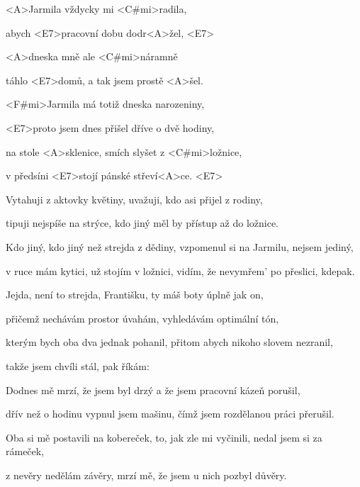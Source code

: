 

\zs
<A>Jarmila vždycky mi <C#mi>radila,

abych <E7>pracovní dobu dodr<A>žel, <E7>

<A>dneska mně ale <C#mi>náramně

táhlo <E7>domů, a tak jsem prostě <A>šel.

<F#mi>Jarmila má totiž dneska narozeniny,

<E7>proto jsem dnes přišel dříve o dvě hodiny,

na stole <A>sklenice, smích slyšet z <C#mi>ložnice,

v předsíni <E7>stojí pánské střeví<A>ce. <E7>
\ks

\zs
Vytahuji z aktovky květiny, uvažuji, kdo asi přijel z rodiny,

tipuji nejspíše na strýce, kdo jiný měl by přístup až do ložnice.

Kdo jiný, kdo jiný než strejda z dědiny, vzpomenul si na Jarmilu, nejsem jediný,

v ruce mám kytici, už stojím v ložnici, vidím, že nevymřem' po přeslici, kdepak.
\ks

\zs
Jejda, není to strejda, Františku, ty máš boty úplně jak on,

přičemž nechávám prostor úvahám, vyhledávám optimální tón,

kterým bych oba dva jednak pohanil, přitom abych nikoho slovem nezranil,

takže jsem chvíli stál, pak říkám: 
\ks

\zs
Dodnes mě mrzí, že jsem byl drzý a že jsem pracovní kázeň porušil,

dřív než o hodinu vypnul jsem mašinu, čímž jsem rozdělanou práci přerušil.

Oba si mě postavili na kobereček, to, jak zle mi vyčinili, nedal jsem si za rámeček,

z nevěry nedělám závěry, mrzí mě, že jsem u nich pozbyl důvěry.
\ks

\kp
